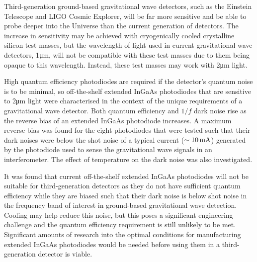 \par
Third-generation ground-based gravitational wave detectors, such as the Einstein Telescope and LIGO Cosmic Explorer, will be far more sensitive and be able to probe deeper into the Universe than the current generation of detectors. The increase in sensitivity may be achieved with cryogenically cooled crystalline silicon test masses, but the wavelength of light used in current gravitational wave detectors, 1\si{\micro\metre}, will not be compatible with these test masses due to them being opaque to this wavelength. Instead, these test masses may work with 2\si{\micro\metre} light.
\par
High quantum efficiency photodiodes are required if the detector's quantum noise is to be minimal, so off-the-shelf extended InGaAs photodiodes that are sensitive to 2\si{\micro\metre} light were characterised in the context of the unique requirements of a gravitational wave detector. Both quantum efficiency and $1/f$ dark noise rise as the reverse bias of an extended InGaAs photodiode increases. A maximum reverse bias was found for the eight photodiodes that were tested such that their dark noises were below the shot noise of a typical current ($\sim10\,\rm{mA}$) generated by the photodiode used to sense the gravitational wave signals in an interferometer. The effect of temperature on the dark noise was also investigated. 
\par
It was found that current off-the-shelf extended InGaAs photodiodes will not be suitable for third-generation detectors as they do not have sufficient quantum efficiency while they are biased such that their dark noise is below shot noise in the frequency band of interest in ground-based gravitational wave detection. Cooling may help reduce this noise, but this poses a significant engineering challenge and the quantum efficiency requirement is still unlikely to be met. Significant amounts of research into the optimal conditions for manufacturing extended InGaAs photodiodes would be needed before using them in a third-generation detector is viable.






